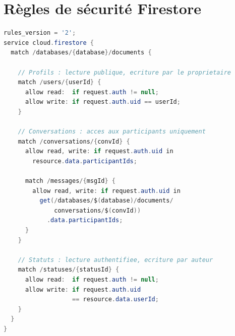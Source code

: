\documentclass[12pt,a4paper]{report}
\begin{document}
\chapter{Règles de sécurité Firestore}
\begin{lstlisting}[language=Java,caption={Règles Firestore recommandées}]
rules_version = '2';
service cloud.firestore {
  match /databases/{database}/documents {

    // Profils : lecture publique, ecriture par le proprietaire
    match /users/{userId} {
      allow read:  if request.auth != null;
      allow write: if request.auth.uid == userId;
    }

    // Conversations : acces aux participants uniquement
    match /conversations/{convId} {
      allow read, write: if request.auth.uid in
        resource.data.participantIds;

      match /messages/{msgId} {
        allow read, write: if request.auth.uid in
          get(/databases/$(database)/documents/
              conversations/$(convId))
            .data.participantIds;
      }
    }

    // Statuts : lecture authentifiee, ecriture par auteur
    match /statuses/{statusId} {
      allow read:  if request.auth != null;
      allow write: if request.auth.uid
                   == resource.data.userId;
    }
  }
}
\end{lstlisting}
\end{document}
